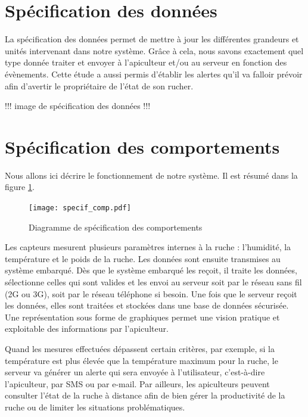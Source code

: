 \clearpage


\section{Spécification des données}
La spécification des données permet de mettre à jour les différentes grandeurs 
et unités intervenant dans notre système. Grâce à cela, nous savons exactement 
quel type donnée traiter et envoyer à l'apiculteur et/ou au serveur en fonction des évènements. Cette étude a aussi permis d'établir les alertes qu'il va falloir prévoir afin d'avertir le propriétaire de l'état de son rucher. 

!!!  image de spécification des données  !!!

\section{Spécification des comportements}

Nous allons ici décrire le fonctionnement de notre système. Il est résumé dans la figure \ref{fig:sp_comp}.

\begin{figure}[h!]
\centering\texttt{[image: specif\_comp.pdf]}
\caption{\label{fig:sp_comp} Diagramme de spécification des comportements}
\end{figure}

Les capteurs mesurent plusieurs paramètres internes à la ruche : l'humidité, la température et le poids de la ruche. Les données sont ensuite transmises au système embarqué. Dès que le système embarqué les reçoit, il traite les données, sélectionne celles qui sont valides et les envoi au serveur soit par le réseau sans fil (2G ou 3G), soit par le réseau téléphone si besoin. Une fois que le serveur reçoit les données, elles sont traitées et stockées dans une base de données sécurisée. Une représentation sous forme de graphiques permet une vision pratique et exploitable des informations par l'apiculteur.

Quand les mesures effectuées dépassent certain critères, par exemple, si la température est plus élevée que la température maximum pour la ruche, le serveur va générer un alerte qui sera envoyée à l'utilisateur, c’est-à-dire l'apiculteur, par SMS ou par e-mail. Par ailleurs, les apiculteurs peuvent consulter l’état de la ruche à distance afin de bien gérer la productivité de la ruche ou de limiter les situations problématiques. 

